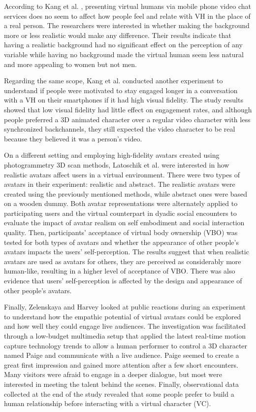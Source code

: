 According to Kang et al. \cite{KAN16}, presenting virtual humans via mobile phone video chat services does no seem to affect how people feel and relate with VH in the place of a real person. The researchers were interested in whether making the background more or less realistic would make any difference. Their results indicate that having a realistic background had no significant effect on the perception of any variable while having no background made the virtual human seem less natural and more appealing to women but not men.

Regarding the same scope, Kang et al. \cite{KAN16A} conducted another experiment to understand if people were motivated to stay engaged longer in a conversation with a VH on their smartphones if it had high visual fidelity. The study results showed that low visual fidelity had little effect on engagement rates, and although people preferred a 3D animated character over a regular video character with less synchronized backchannels, they still expected the video character to be real because they believed it was a person's video.

On a different setting and employing high-fidelity avatars created using photogrammetry 3D scan methods, Latoschik et al. \cite{LAT17} were interested in how realistic avatars affect users in a virtual environment. There were two types of avatars in their experiment: realistic and abstract. The realistic avatars were created using the previously mentioned methods, while abstract ones were based on a wooden dummy. Both avatar representations were alternately applied to participating users and the virtual counterpart in dyadic social encounters to evaluate the impact of avatar realism on self embodiment and social interaction quality. Then, participants' acceptance of virtual body ownership (VBO) was tested for both types of avatars and whether the appearance of other people's avatars impacts the users' self-perception. The results suggest that when realistic avatars are used as avatars for others, they are perceived as considerably more human-like, resulting in a higher level of acceptance of VBO. There was also evidence that users' self-perception is affected by the design and appearance of other people's avatars.

Finally, Zelenskaya and Harvey \cite{ZEL19} looked at public reactions during an experiment to understand how the empathic potential of virtual avatars could be explored and how well they could engage live audiences. The investigation was facilitated through a low-budget multimedia setup that applied the latest real-time motion capture technology trends to allow a human performer to control a 3D character named Paige and communicate with a live audience. Paige seemed to create a great first impression and gained more attention after a few short encounters. Many visitors were afraid to engage in a deeper dialogue, but most were interested in meeting the talent behind the scenes. Finally, observational data collected at the end of the study revealed that some people prefer to build a human relationship before interacting with a virtual character (VC).

